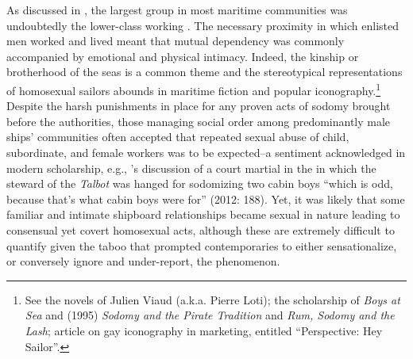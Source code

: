 As discussed in , the largest group in most maritime communities was undoubtedly the lower-class working . The necessary proximity in which enlisted men worked and lived meant that mutual dependency was commonly accompanied by emotional and physical intimacy. Indeed, the kinship or brotherhood of the seas is a common theme and the stereotypical representations of homosexual sailors abounds in maritime fiction and popular iconography.\footnote{See the novels of Julien Viaud (a.k.a. Pierre Loti); the scholarship of  \textit{Boys at Sea} and (1995) \textit{Sodomy and the Pirate Tradition} and  \textit{Rum, Sodomy and the Lash};  article on gay iconography in marketing, entitled “Perspective: Hey Sailor”.} Despite the harsh punishments in place for any proven acts of sodomy brought before the authorities, those managing social order among predominantly male ships’ communities often accepted that repeated sexual abuse of child, subordinate, and female workers was to be expected–a sentiment acknowledged in modern scholarship, e.g., \citeauthor{Bicheno2012}’s discussion of a court martial in the  in which the steward of the \textit{Talbot} was hanged for sodomizing two cabin boys “which is odd, because that’s what cabin boys were for” (2012: 188). Yet, it was likely that some familiar and intimate shipboard relationships became sexual in nature leading to consensual yet covert homosexual acts, although these are extremely difficult to quantify given the taboo that prompted contemporaries to either sensationalize, or conversely ignore and under-report, the phenomenon. 

